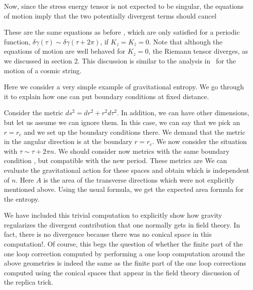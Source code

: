  Now, since the stress energy tensor is not expected to be singular,  the equations of motion
 imply that the     two potentially divergent terms should cancel
\eqn{}

These are the same equations as before \condc , which are only satisfied for  a periodic function,
$\delta \gamma(\tau) \sim \delta \gamma (\tau+2\pi)$, if $K_z=K_{\bar{z}}=0$. Note that although the equations of motion are well behaved for $K_z=0$, the Riemann tensor diverges, as we discussed in section 2. This discussion is similar
to the analysis in \UnruhHY\ for the motion of a cosmic string.




Here we consider a very simple example of gravitational entropy. We go through it to explain how one
can put boundary conditions at fixed distance.

Consider the metric  $ds^2 = dr^2 + r^2 d\tau^2 $.
In addition, we can have other dimensions, but let us assume we can ignore them.
In this case,  we can say that we pick an $r=r_c$ and we set up the boundary conditions there. We demand
that the metric in the angular direction is
\eqn{}
at the boundary $r=r_c$. We now consider the situation with $\tau \sim \tau + 2 \pi n$.
We should consider now metrics with the same boundary condition \bdcd , but compatible with the new period.
These metrics are
\eqn{}
We can evaluate the gravitational action for these spaces and obtain
\eqn{}
which is independent of $n$. Here $A$ is the area of the transverse directions which were not explicitly mentioned above.
Using the usual formula, we get the expected area formula for the entropy.

We have included this trivial computation to explicitly show how gravity regularizes the divergent contribution that
one normally gets in field theory. In fact, there is no divergence because there was no conical space in this
computation!. Of course, this begs the question of whether the finite part of the
one loop correction computed by performing a one
loop computation around the above geometries is indeed the same as the finite part of the
 one loop corrections computed using the
conical spaces that appear in the field theory discussion of the replica trick.





\raggedright

\listrefs


\bye





